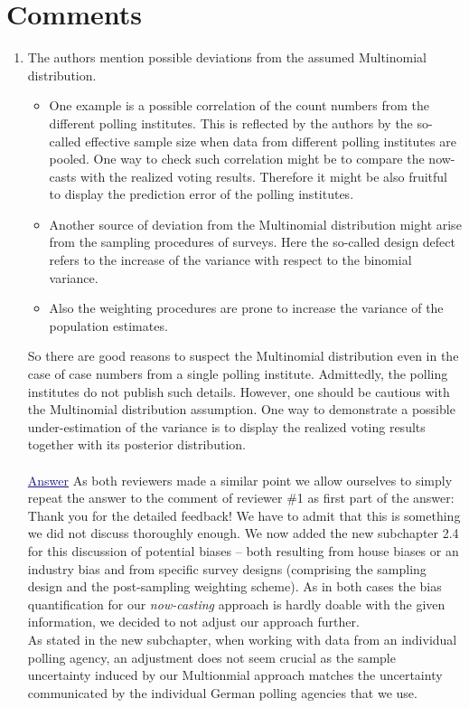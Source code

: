 \documentclass{scrartcl}
\newcommand{\blue}[1]{\textcolor{MidnightBlue}{\underline{\textcolor{MidnightBlue}{#1}}}}
\begin{document}
\section*{Comments}
\begin{enumerate}
  \item The authors mention possible deviations from the assumed Multinomial distribution.
  \begin{itemize}
    \item One example is a possible correlation of the count numbers from the different polling institutes. This is reflected by the authors by the so-called effective sample size when data from different polling institutes are pooled. One way to check such correlation might be to compare the now-casts with the realized voting results. Therefore it might be also fruitful to display the prediction error of the polling institutes.
    \item Another source of deviation from the Multinomial distribution might arise from the sampling procedures of surveys. Here the so-called design defect refers to the increase of the variance with respect to the binomial variance.
    \item Also the weighting procedures are prone to increase the variance of the population estimates.
  \end{itemize}
  So there are good reasons to suspect the Multinomial distribution even in the case of case numbers from a single polling institute. Admittedly, the polling
institutes do not publish such details. However, one should be cautious with the Multinomial distribution assumption. One way to demonstrate a possible under-estimation of the variance is to display the realized voting results together with its posterior distribution.
  \\ \\
  \blue{Answer} As both reviewers made a similar point we allow ourselves to simply repeat the answer to the comment of reviewer \#1 as first part of the answer: \\
Thank you for the detailed feedback! We have to admit that this is something we did not discuss
thoroughly enough. We now added the new subchapter 2.4 for this discussion of potential biases -- both resulting from house biases or an industry bias and from specific survey designs (comprising the sampling design and the post-sampling weighting scheme). As in both cases the bias quantification for our \emph{now-casting} approach is hardly doable with the given information, we decided to not adjust our approach further. \\
As stated in the new subchapter, when working with data from an individual polling agency, an adjustment does not seem crucial as the sample uncertainty induced by our Multionmial approach matches the uncertainty communicated by the individual German polling agencies that we use.\\


\end{enumerate}
\end{document}
